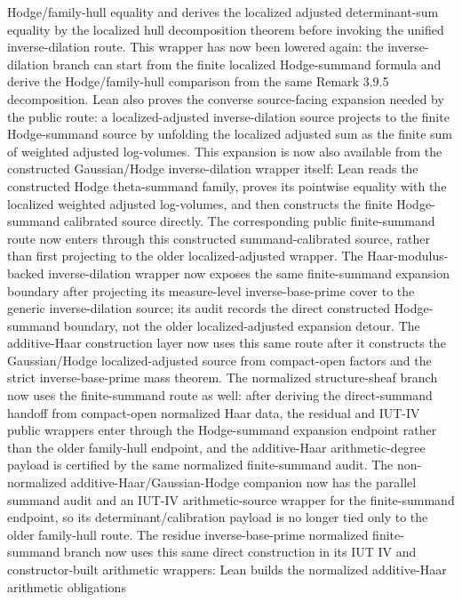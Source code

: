 \documentclass[11pt]{article}
\theoremstyle{plain}
\theoremstyle{definition}
\theoremstyle{remark}
\begin{document}
  Hodge/family-hull equality and derives the localized adjusted determinant-sum
  equality by the localized hull decomposition theorem before invoking the
  unified inverse-dilation route.  This wrapper has now been lowered again:
  the inverse-dilation branch can start from the finite localized Hodge-summand
  formula and derive the Hodge/family-hull comparison from the same
  Remark 3.9.5 decomposition.  Lean also proves the converse source-facing
  expansion needed by the public route: a localized-adjusted inverse-dilation
  source projects to the finite Hodge-summand source by unfolding the
  localized adjusted sum as the finite sum of weighted adjusted log-volumes.
  This expansion is now also available from the constructed Gaussian/Hodge
  inverse-dilation wrapper itself: Lean reads the constructed
  Hodge theta-summand family, proves its pointwise equality with the localized
  weighted adjusted log-volumes, and then constructs the finite Hodge-summand
  calibrated source directly.  The corresponding public finite-summand route
  now enters through this constructed summand-calibrated source, rather than
  first projecting to the older localized-adjusted wrapper.
  The Haar-modulus-backed inverse-dilation wrapper now exposes the same
  finite-summand expansion boundary after projecting its measure-level
  inverse-base-prime cover to the generic inverse-dilation source; its audit
  records the direct constructed Hodge-summand boundary, not the older
  localized-adjusted expansion detour.
  The additive-Haar construction layer now uses this same route after it
  constructs the Gaussian/Hodge localized-adjusted source from compact-open
  factors and the strict inverse-base-prime mass theorem.
  The normalized structure-sheaf branch now uses the finite-summand route as
  well: after deriving the direct-summand handoff from compact-open
  normalized Haar data, the residual and IUT-IV public wrappers enter through
  the Hodge-summand expansion endpoint rather than the older family-hull
  endpoint, and the additive-Haar arithmetic-degree payload is certified by the
  same normalized finite-summand audit.  The non-normalized
  additive-Haar/Gaussian-Hodge companion now has the parallel summand audit and
  an IUT-IV arithmetic-source wrapper for the finite-summand endpoint, so its
  determinant/calibration payload is no longer tied only to the older
  family-hull route.
  The residue inverse-base-prime normalized finite-summand branch now uses this
  same direct construction in its IUT IV and constructor-built arithmetic
  wrappers: Lean builds the normalized additive-Haar arithmetic obligations
\end{document}
